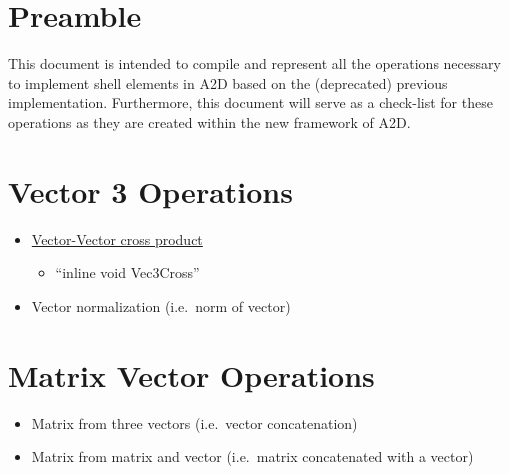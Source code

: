 \documentclass[11pt]{article}
\begin{document}
\section{Preamble}\label{sec:preamble}
    This document is intended to compile and represent all the operations necessary to implement shell elements in A2D based on the (deprecated) previous implementation.
    Furthermore, this document will serve as a check-list for these operations as they are created within the new framework of A2D\@.




\section{Vector 3 Operations}\label{sec:vector-3-operations}
    \begin{itemize}
        \item \href{../include/a2dvecops3d.h}{Vector-Vector cross product}
        \begin{itemize}
            \item ``inline void Vec3Cross''
        \end{itemize}
        \item Vector normalization (i.e.\ norm of vector)
    \end{itemize}


\section{Matrix Vector Operations}\label{sec:matrix-vector-operations}
    \begin{itemize}
        \item Matrix from three vectors (i.e.\ vector concatenation)
        \item Matrix from matrix and vector (i.e.\ matrix concatenated with a vector)
    \end{itemize}
\end{document}
